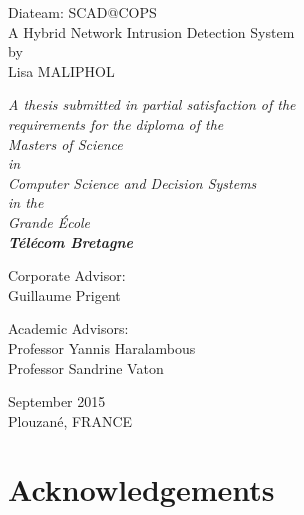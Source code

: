 \documentclass[12pt,]{article}
\begin{document}
\begin{center}

\vspace{30mm}

{\Huge Diateam: SCAD@COPS}\\
\bigskip
{\Huge A Hybrid Network Intrusion Detection System}\\
\vspace{15mm}
{\Large by}\\

\vspace{18mm}
{\huge Lisa MALIPHOL}\\

\vspace{25mm}

\textit{A thesis submitted in partial satisfaction of the}\\
\medskip
\textit{requirements for the diploma of the}\\
\medskip
\textit{Masters of Science}\\
\medskip
\textit{in}\\
\medskip
\textit{Computer Science and Decision Systems}\\
\medskip
\textit{in the}\\
\medskip
\textit{Grande École}\\
\medskip
\textbf{\textit{\Large Télécom Bretagne}}\\

\vspace{10mm}

Corporate Advisor:\\
\medskip
Guillaume Prigent\\
\bigskip

Academic Advisors:\\
\medskip
Professor Yannis Haralambous\\
\medskip
Professor Sandrine Vaton\\

\vspace{15mm}

September 2015\\
\medskip
Plouzané, FRANCE\\

\end{center}

\thispagestyle{empty} \newpage
\mbox{} \thispagestyle{empty}

\newpage

\section*{Acknowledgements}\label{acknowledgements}
\end{document}
